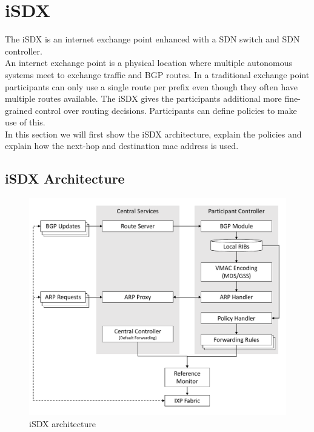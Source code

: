 \section{\label{chapter2:iSDX}iSDX}

The iSDX is an internet exchange point enhanced with a SDN switch and SDN controller.\\
An internet exchange point is a physical location where multiple autonomous systems meet to exchange traffic and BGP routes. In a traditional exchange point participants can only use a single route per prefix even though they often have multiple routes available. The iSDX gives the participants additional more fine-grained control over routing decisions. Participants can define policies to make use of this.  \\
In this section we will first show the iSDX architecture, explain the policies and explain how the next-hop and destination mac address is used.

\subsection{\label{chapter2:iSX:iSDX architecture}iSDX Architecture}
\begin{figure}[h]
\includegraphics[scale = 0.4]{Figures/bckdgrnd_sdx_architecture_cropped.pdf}
\caption{iSDX architecture}
\end{figure}

